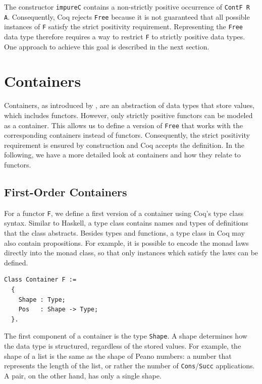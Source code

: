 \documentclass[a4paper, 11pt, fleqn, twoside, abstract=on]{scrreprt}
\newcommand{\cinl}[1]{\texttt{#1}}
\begin{document}
The constructor \texttt{impureC} contains a non-strictly positive occurrence of \texttt{ContF R A}.
Consequently, Coq rejects \texttt{Free} because it is not guaranteed that all possible instances of \cinl{F} satisfy the strict positivity requirement.
Representing the \texttt{Free} data type therefore requires a way to restrict \cinl{F} to strictly positive data types.
One approach to achieve this goal is described in the next section.

\section{Containers}

Containers, as introduced by \citet{abbott2003categories}, are an abstraction of data types that store values, which includes functors.
However, only strictly positive functors can be modeled as a container.
This allows us to define a version of \cinl{Free} that works with the corresponding containers instead of functors.
Consequently, the strict positivity requirement is ensured by construction and Coq accepts the definition.
In the following, we have a more detailed look at containers and how they relate to functors.

\subsection{First-Order Containers}
For a functor \cinl{F}, we define a first version of a container using Coq's type class syntax.
Similar to Haskell, a type class contains names and types of definitions that the class abstracts.
Besides types and functions, a type class in Coq may also contain propositions.
For example, it is possible to encode the monad laws directly into the monad class, so that only instances which satisfy the laws can be defined.

\begin{verbatim}
Class Container F :=
  {
    Shape : Type;
    Pos   : Shape -> Type;
  }.
\end{verbatim}

The first component of a container is the type \texttt{Shape}.
A shape determines how the data type is structured, regardless of the stored values.
For example, the  shape of a list is the same as the shape of Peano numbers: a number that  represents the length of the list, or rather the number of \cinl{Cons}/\cinl{Succ} applications.
A pair, on the other hand, has only a single shape.
\end{document}
